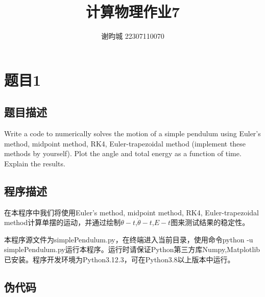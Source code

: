 \documentclass[11pt]{article}
\author{谢昀城 22307110070}
\title{计算物理作业7}
\begin{document}
\maketitle




  \section{题目1}
  \subsection{题目描述}
  
  Write a code to numerically solves the motion of a simple pendulum using Euler’s method, midpoint method, RK4, Euler-trapezoidal method (implement these methods by yourself). Plot the angle and total energy as a function of time. Explain the results.


\subsection{程序描述}
   在本程序中我们将使用Euler’s method, midpoint method, RK4, Euler-trapezoidal method计算单摆的运动，并通过绘制$\theta-t$,$\dot{\theta}-t$,$E-t$图来测试结果的稳定性。

本程序源文件为simplePendulum.py，在终端进入当前目录，使用命令python -u simplePendulum.py运行本程序。运行时请保证Python第三方库Numpy,Matplotlib已安装。程序开发环境为Python3.12.3，可在Python3.8以上版本中运行。

\subsection{伪代码}
\end{document}
